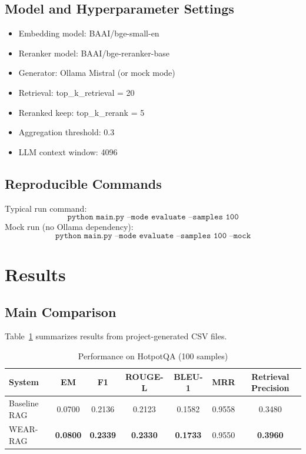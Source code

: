 \documentclass[10pt,draftclsnofoot,onecolumn,journal]{IEEEtran}
\begin{document}
\subsection{Model and Hyperparameter Settings}
\begin{itemize}
\item Embedding model: BAAI/bge-small-en
\item Reranker model: BAAI/bge-reranker-base
\item Generator: Ollama Mistral (or mock mode)
\item Retrieval: top\_k\_retrieval = 20
\item Reranked keep: top\_k\_rerank = 5
\item Aggregation threshold: 0.3
\item LLM context window: 4096
\end{itemize}

\subsection{Reproducible Commands}
Typical run command:
\begin{equation}
\texttt{python main.py --mode evaluate --samples 100}
\end{equation}
Mock run (no Ollama dependency):
\begin{equation}
\texttt{python main.py --mode evaluate --samples 100 --mock}
\end{equation}

\section{Results}
\subsection{Main Comparison}
Table~\ref{tab:main-results} summarizes results from project-generated CSV files.

\begin{table}[t]
\centering
\caption{Performance on HotpotQA (100 samples)}
\label{tab:main-results}
\begin{tabular}{lcccccc}
\toprule
System & EM & F1 & ROUGE-L & BLEU-1 & MRR & Retrieval Precision \\
\midrule
Baseline RAG & 0.0700 & 0.2136 & 0.2123 & 0.1582 & 0.9558 & 0.3480 \\
WEAR-RAG & \textbf{0.0800} & \textbf{0.2339} & \textbf{0.2330} & \textbf{0.1733} & 0.9550 & \textbf{0.3960} \\
\bottomrule
\end{tabular}
\end{table}
\end{document}
